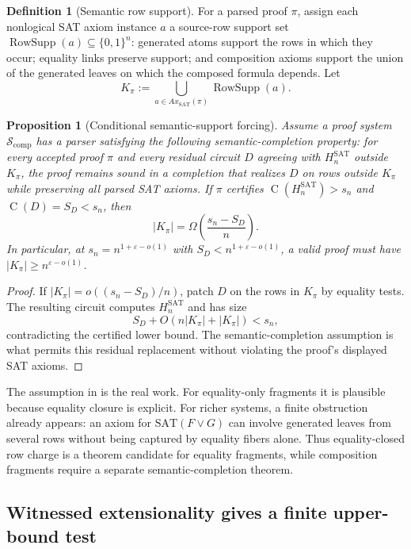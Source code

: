 \documentclass[11pt]{article}
\newtheorem{proposition}[theorem]{Proposition}
\theoremstyle{definition}
\newtheorem{definition}[theorem]{Definition}
\newcommand{\bits}{\{0,1\}}
\newcommand{\Ckt}{\operatorname{C}}
\newcommand{\SAT}{\mathrm{SAT}}
\newcommand{\eps}{\varepsilon}
\newcommand{\Hsat}{H_n^{\SAT}}
\newcommand{\RowSupp}{\operatorname{RowSupp}}
\begin{document}
\begin{definition}[Semantic row support]\label{def:semantic-row-support}
For a parsed proof $\pi$, assign each nonlogical SAT axiom instance $a$ a source-row support set $\RowSupp(a)\subseteq\bits^n$: generated atoms support the rows in which they occur; equality links preserve support; and composition axioms support the union of the generated leaves on which the composed formula depends. Let
\[
  K_\pi:=\bigcup_{a\in Ax_{\SAT}(\pi)}\RowSupp(a).
\]
\end{definition}

\begin{proposition}[Conditional semantic-support forcing]\label{prop:semantic-support-forcing}
Assume a proof system $\mathcal{S}_{\mathrm{comp}}$ has a parser satisfying the following semantic-completion property: for every accepted proof $\pi$ and every residual circuit $D$ agreeing with $\Hsat$ outside $K_\pi$, the proof remains sound in a completion that realizes $D$ on rows outside $K_\pi$ while preserving all parsed SAT axioms. If $\pi$ certifies $\Ckt(\Hsat)>s_n$ and $\Ckt(D)=S_D<s_n$, then
\[
  |K_\pi|=\Omega\!\left(\frac{s_n-S_D}{n}\right).
\]
In particular, at $s_n=n^{1+\eps-o(1)}$ with $S_D<n^{1+\eps-o(1)}$, a valid proof must have $|K_\pi|\ge n^{\eps-o(1)}$.
\end{proposition}

\begin{proof}
If $|K_\pi|=o((s_n-S_D)/n)$, patch $D$ on the rows in $K_\pi$ by equality tests. The resulting circuit computes $\Hsat$ and has size
\[
  S_D+O(n|K_\pi|+|K_\pi|)<s_n,
\]
contradicting the certified lower bound. The semantic-completion assumption is what permits this residual replacement without violating the proof's displayed SAT axioms.
\end{proof}

The assumption in  is the real work. For equality-only fragments it is plausible because equality closure is explicit. For richer systems, a finite obstruction already appears: an axiom for $\SAT(F\lor G)$ can involve generated leaves from several rows without being captured by equality fibers alone. Thus equality-closed row charge is a theorem candidate for equality fragments, while composition fragments require a separate semantic-completion theorem.

\subsection{Witnessed extensionality gives a finite upper-bound test}
\end{document}
